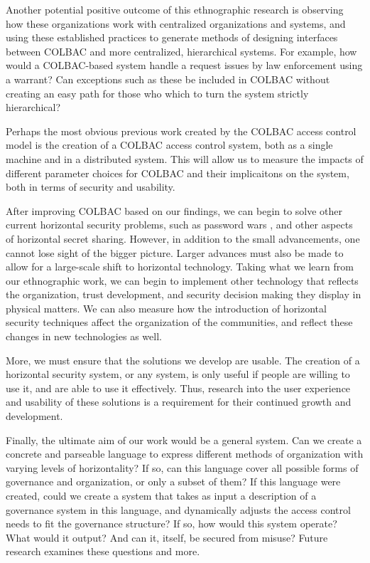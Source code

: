 Another potential positive outcome of this ethnographic research is observing
how these organizations work with centralized organizations and systems, and
using these established practices to generate methods of designing interfaces
between COLBAC and more centralized, hierarchical systems. For example, how
would a COLBAC-based system handle a request issues by law enforcement using a
warrant? Can exceptions such as these be included in COLBAC without creating an
easy path for those who which to turn the system strictly hierarchical?

Perhaps the most obvious previous work created by the COLBAC access control
model is the creation of a COLBAC access control system, both as a single
machine and in a distributed system. This will allow us to measure the impacts
of different parameter choices for COLBAC and their implicaitons on the system,
both in terms of security and usability.

After improving COLBAC based on our findings, we can begin to solve other
current horizontal security problems, such as password wars
\cite{kavada2020counterpublics}, and other aspects of horizontal secret sharing.
However, in addition to the small advancements, one cannot lose sight of the
bigger picture. Larger advances must also be made to allow for a large-scale
shift to horizontal technology. Taking what we learn from our ethnographic work,
we can begin to implement other technology that reflects the organization, trust
development, and security decision making they display in physical matters. We
can also measure how the introduction of horizontal security techniques affect
the organization of the communities, and reflect these changes in new
technologies as well.

More, we must ensure that the solutions we develop are usable. The creation of
a horizontal security system, or any system,  is only useful if people are
willing to use it, and are able to use it effectively. Thus, research into the
user experience and usability of these solutions is a requirement for their
continued growth and development.

Finally, the ultimate aim of our work would be a general system. Can we create a
concrete and parseable language to express different methods of organization
with varying levels of horizontality? If so, can this language cover all
possible forms of governance and organization, or only a subset of them? If this
language were created, could we create a system that takes as input a
description of a governance system in this language, and dynamically adjusts the
access control needs to fit the governance structure? If so, how would this
system operate? What would it output? And can it, itself, be secured from
misuse? Future research examines these questions and more.
